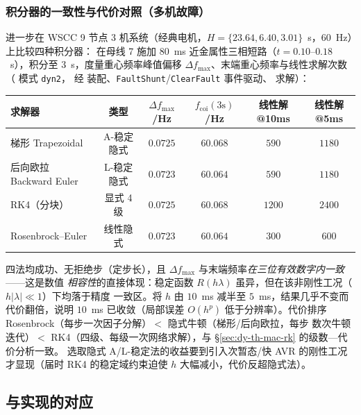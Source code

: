 \subsubsection{积分器的一致性与代价对照（多机故障）}
进一步在 WSCC 9 节点 3 机系统（经典电机，$H{=}\{23.64,6.40,3.01\}$~s，$60$~Hz）上比较四种积分器：
在母线 7 施加 $80$~ms 近金属性三相短路（$t{=}0.10$--$0.18$~s），积分至 $3$~s，度量重心频率峰值偏移
$\Delta f_{\max}$、末端重心频率与线性求解次数（ 模式 \texttt{dyn2}，
经  装配、\texttt{FaultShunt}/\texttt{ClearFault} 事件驱动、
 求解）：
\begin{center}\footnotesize
\begin{tabular}{@{}lccccc@{}}
\toprule
求解器 & 类型 & $\Delta f_{\max}$/Hz & $f_{\mathrm{coi}}(3\mathrm s)$/Hz & 线性解@10ms & 线性解@5ms\\
\midrule
梯形 Trapezoidal & A-稳定隐式 & $0.0725$ & $60.068$ & $590$ & $1180$\\
后向欧拉 Backward Euler & L-稳定隐式 & $0.0723$ & $60.064$ & $590$ & $1180$\\
RK4（分块） & 显式 4 级 & $0.0725$ & $60.068$ & $1200$ & $2400$\\
Rosenbrock--Euler & 线性隐式 & $0.0723$ & $60.064$ & $300$ & $600$\\
\bottomrule
\end{tabular}
\end{center}
四法均成功、无拒绝步（定步长），且 $\Delta f_{\max}$ 与末端频率\emph{在三位有效数字内一致}——这是数值
\emph{相容性}的直接体现：稳定函数 $R(h\lambda)$ 虽异，但在该非刚性工况（$h|\lambda|\ll1$）下均落于精度
一致区。将 $h$ 由 $10$~ms 减半至 $5$~ms，结果几乎不变而代价翻倍，说明 $10$~ms 已收敛（局部误差
$O(h^{p})$ 低于分辨率）。代价排序 Rosenbrock（每步一次因子分解）$<$ 隐式牛顿（梯形/后向欧拉，每步
数次牛顿迭代）$<$ RK4（四级、每级一次网络求解），与 §\ref{sec:dy-th-mac-rk} 的级数—代价分析一致。
选取隐式 A/L-稳定法的收益要到引入次暂态/快 AVR 的刚性工况才显现（届时 RK4 的稳定域约束迫使
$h$ 大幅减小，代价反超隐式法）。

\subsection{与实现的对应}

